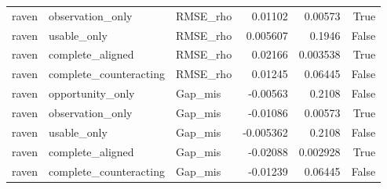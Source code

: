 \begin{tabular}{lllrrr}
raven & observation_only & RMSE_rho & 0.01102 & 0.00573 & True \\
raven & usable_only & RMSE_rho & 0.005607 & 0.1946 & False \\
raven & complete_aligned & RMSE_rho & 0.02166 & 0.003538 & True \\
raven & complete_counteracting & RMSE_rho & 0.01245 & 0.06445 & False \\
raven & opportunity_only & Gap_mis & -0.00563 & 0.2108 & False \\
raven & observation_only & Gap_mis & -0.01086 & 0.00573 & True \\
raven & usable_only & Gap_mis & -0.005362 & 0.2108 & False \\
raven & complete_aligned & Gap_mis & -0.02088 & 0.002928 & True \\
raven & complete_counteracting & Gap_mis & -0.01239 & 0.06445 & False \\
\bottomrule
\end{tabular}
